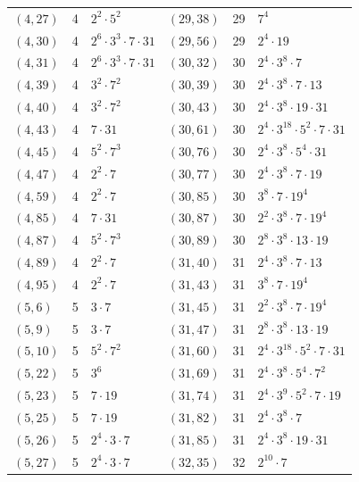 \documentclass[11pt]{article}
\begin{document}
\begin{longtable}{@{}lrl@{\qquad}lrl@{}}
$(4,27)$ & 4 & $2^{2}\cdot 5^{2}$ & $(29,38)$ & 29 & $7^{4}$\\
$(4,30)$ & 4 & $2^{6}\cdot 3^{3}\cdot 7\cdot 31$ & $(29,56)$ & 29 & $2^{4}\cdot 19$\\
$(4,31)$ & 4 & $2^{6}\cdot 3^{3}\cdot 7\cdot 31$ & $(30,32)$ & 30 & $2^{4}\cdot 3^{8}\cdot 7$\\
$(4,39)$ & 4 & $3^{2}\cdot 7^{2}$ & $(30,39)$ & 30 & $2^{4}\cdot 3^{8}\cdot 7\cdot 13$\\
$(4,40)$ & 4 & $3^{2}\cdot 7^{2}$ & $(30,43)$ & 30 & $2^{4}\cdot 3^{8}\cdot 19\cdot 31$\\
$(4,43)$ & 4 & $7\cdot 31$ & $(30,61)$ & 30 & $2^{4}\cdot 3^{18}\cdot 5^{2}\cdot 7\cdot 31$\\
$(4,45)$ & 4 & $5^{2}\cdot 7^{3}$ & $(30,76)$ & 30 & $2^{4}\cdot 3^{8}\cdot 5^{4}\cdot 31$\\
$(4,47)$ & 4 & $2^{2}\cdot 7$ & $(30,77)$ & 30 & $2^{4}\cdot 3^{8}\cdot 7\cdot 19$\\
$(4,59)$ & 4 & $2^{2}\cdot 7$ & $(30,85)$ & 30 & $3^{8}\cdot 7\cdot 19^{4}$\\
$(4,85)$ & 4 & $7\cdot 31$ & $(30,87)$ & 30 & $2^{2}\cdot 3^{8}\cdot 7\cdot 19^{4}$\\
$(4,87)$ & 4 & $5^{2}\cdot 7^{3}$ & $(30,89)$ & 30 & $2^{8}\cdot 3^{8}\cdot 13\cdot 19$\\
$(4,89)$ & 4 & $2^{2}\cdot 7$ & $(31,40)$ & 31 & $2^{4}\cdot 3^{8}\cdot 7\cdot 13$\\
$(4,95)$ & 4 & $2^{2}\cdot 7$ & $(31,43)$ & 31 & $3^{8}\cdot 7\cdot 19^{4}$\\
$(5,6)$ & 5 & $3\cdot 7$ & $(31,45)$ & 31 & $2^{2}\cdot 3^{8}\cdot 7\cdot 19^{4}$\\
$(5,9)$ & 5 & $3\cdot 7$ & $(31,47)$ & 31 & $2^{8}\cdot 3^{8}\cdot 13\cdot 19$\\
$(5,10)$ & 5 & $5^{2}\cdot 7^{2}$ & $(31,60)$ & 31 & $2^{4}\cdot 3^{18}\cdot 5^{2}\cdot 7\cdot 31$\\
$(5,22)$ & 5 & $3^{6}$ & $(31,69)$ & 31 & $2^{4}\cdot 3^{8}\cdot 5^{4}\cdot 7^{2}$\\
$(5,23)$ & 5 & $7\cdot 19$ & $(31,74)$ & 31 & $2^{4}\cdot 3^{9}\cdot 5^{2}\cdot 7\cdot 19$\\
$(5,25)$ & 5 & $7\cdot 19$ & $(31,82)$ & 31 & $2^{4}\cdot 3^{8}\cdot 7$\\
$(5,26)$ & 5 & $2^{4}\cdot 3\cdot 7$ & $(31,85)$ & 31 & $2^{4}\cdot 3^{8}\cdot 19\cdot 31$\\
$(5,27)$ & 5 & $2^{4}\cdot 3\cdot 7$ & $(32,35)$ & 32 & $2^{10}\cdot 7$\\

\end{longtable}
\end{document}
